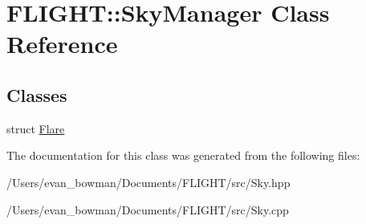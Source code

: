 \hypertarget{class_f_l_i_g_h_t_1_1_sky_manager}{}\section{F\+L\+I\+G\+HT\+:\+:Sky\+Manager Class Reference}
\label{class_f_l_i_g_h_t_1_1_sky_manager}
\subsection*{Classes}
\begin{DoxyCompactItemize}
\item 
struct \hyperlink{struct_f_l_i_g_h_t_1_1_sky_manager_1_1_flare}{Flare}
\end{DoxyCompactItemize}


The documentation for this class was generated from the following files\+:\begin{DoxyCompactItemize}
\item 
/\+Users/evan\+\_\+bowman/\+Documents/\+F\+L\+I\+G\+H\+T/src/Sky.\+hpp\item 
/\+Users/evan\+\_\+bowman/\+Documents/\+F\+L\+I\+G\+H\+T/src/Sky.\+cpp\end{DoxyCompactItemize}
